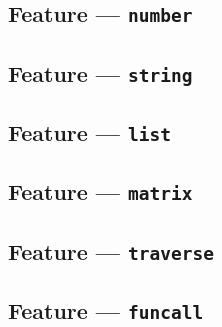 
\subsection{Feature --- \texttt{number}} %
\label{sub:feature_number}


\subsection{Feature --- \texttt{string}} %
\label{sub:feature_string}


\subsection{Feature --- \texttt{list}} %
\label{sub:feature_list}


\subsection{Feature --- \texttt{matrix}} %
\label{sub:feature_matrix}


\subsection{Feature --- \texttt{traverse}} %
\label{sub:feature_traverse}


\subsection{Feature --- \texttt{funcall}} %
\label{sub:feature_funcall}

